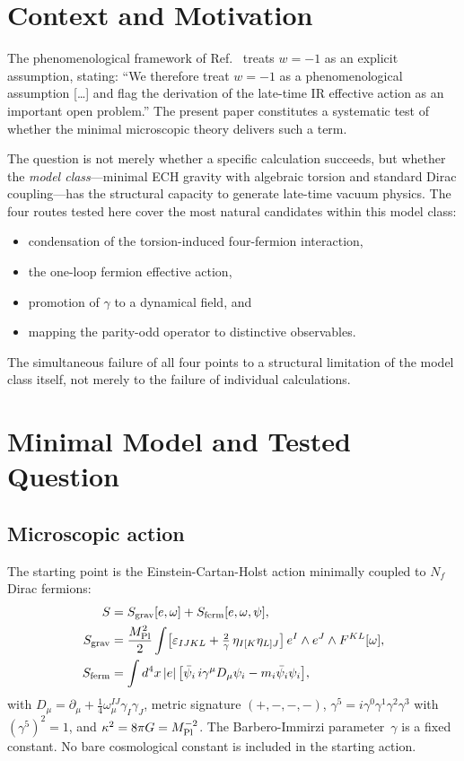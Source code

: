 \documentclass[11pt,letterpaper]{article}
\newcommand{\MPl}{M_{\rm Pl}}
\newcommand{\BI}{\gamma}               %
\begin{document}
\section{Context and Motivation}\label{sec:context}

The phenomenological framework of Ref.~\cite{Golden2026} treats $w=-1$ as an
explicit assumption, stating: ``We therefore treat $w=-1$ as a
phenomenological assumption [\ldots] and flag the derivation of the late-time
IR effective action as an important open problem.'' The present paper
constitutes a systematic test of whether the minimal microscopic theory
delivers such a term.

The question is not merely whether a specific calculation succeeds, but
whether the \emph{model class}---minimal ECH gravity with algebraic torsion
and standard Dirac coupling---has the structural capacity to generate
late-time vacuum physics. The four routes tested here cover the most natural
candidates within this model class:
\begin{itemize}
  \item condensation of the torsion-induced four-fermion interaction,
  \item the one-loop fermion effective action,
  \item promotion of $\BI$ to a dynamical field, and
  \item mapping the parity-odd operator to distinctive observables.
\end{itemize}
The simultaneous failure of all four points to a structural limitation of the
model class itself, not merely to the failure of individual calculations.

\section{Minimal Model and Tested Question}\label{sec:model}

\subsection{Microscopic action}

The starting point is the Einstein-Cartan-Holst action minimally coupled to
$N_f$ Dirac fermions:
\begin{align}
  S &= S_{\rm grav}[e,\omega] + S_{\rm ferm}[e,\omega,\psi], \label{eq:action}\\
  S_{\rm grav} &= \frac{\MPl^2}{2}\int
    \bigl[\varepsilon_{IJKL} + \tfrac{2}{\BI}\,\eta_{I[K}\eta_{L]J}\bigr]\,
    e^I\wedge e^J\wedge F^{KL}[\omega], \label{eq:Sgrav}\\
  S_{\rm ferm} &= \int d^4x\,|e|\,
    \bigl[\bar\psi_i\,i\gamma^\mu D_\mu\psi_i - m_i\bar\psi_i\psi_i\bigr],
    \label{eq:Sferm}
\end{align}
with $D_\mu = \partial_\mu + \tfrac{1}{4}\omega_\mu^{IJ}\gamma_I\gamma_J$,
metric signature $(+,-,-,-)$, $\gamma^5=i\gamma^0\gamma^1\gamma^2\gamma^3$
with $(\gamma^5)^2=1$, and $\kappa^2 = 8\pi G = \MPl^{-2}$. The
Barbero-Immirzi parameter~$\BI$ is a fixed constant. No bare cosmological
constant is included in the starting action.
\end{document}
